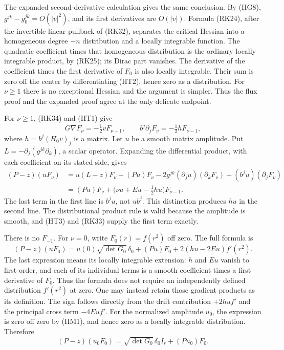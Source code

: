 \documentclass[
  11pt,
]{article}
\begin{document}
The expanded second-derivative calculation gives the same conclusion. By
(HG8), \(g^{jk}-g_0^{jk}=O(|v|^2)\), and its first derivatives are
\(O(|v|)\). Formula (RK24), after the invertible linear pullback of
(RK32), separates the critical Hessian into a homogeneous degree \(-n\)
distribution and a locally integrable function. The quadratic
coefficient times that homogeneous distribution is the ordinary locally
integrable product, by (RK25); its Dirac part vanishes. The derivative
of the coefficient times the first derivative of \(F_0\) is also locally
integrable. Their sum is zero off the center by differentiating (HT2),
hence zero as a distribution. For \(\nu\geq1\) there is no exceptional
Hessian and the argument is simpler. Thus the flux proof and the
expanded proof agree at the only delicate endpoint.

For \(\nu\geq1\), (RK34) and (HT1) give \[
       G\nabla F_\nu=-\tfrac12v F_{\nu-1},\qquad
       b^j\partial_jF_\nu=-\tfrac12 hF_{\nu-1},               \tag{HT4}
\] where \(h=b^j(H_0v)_j\) is a matrix. Let \(u\) be a smooth matrix
amplitude. Put \(L=-\partial_j(g^{jk}\partial_k)\), a scalar operator.
Expanding the differential product, with each coefficient on its stated
side, gives \[
\begin{split}
 (P-z)(uF_\nu)
 &=u(L-z)F_\nu+(Pu)F_\nu
       -2g^{jk}(\partial_ju)(\partial_kF_\nu)
       +(b^ju)(\partial_jF_\nu)\\
 &=(Pu)F_\nu+
       \bigl(\nu u+Eu-\tfrac12hu\bigr)F_{\nu-1}.
\end{split}                                                    \tag{HT5}
\] The last term in the first line is \(b^ju\), not \(ub^j\). This
distinction produces \(hu\) in the second line. The distributional
product rule is valid because the amplitude is smooth, and (HT3) and
(RK33) supply the first term exactly.

There is no \(F_{-1}\). For \(\nu=0\), write \(F_0(r)=f(r^2)\) off zero.
The full formula is \[
 (P-z)(uF_0)
   =u(0)\sqrt{\det G_0}\,\delta_0
         +(Pu)F_0+2(hu-2Eu)f'(r^2).                           \tag{HT6}
\] The last expression means its locally integrable extension: \(h\) and
\(Eu\) vanish to first order, and each of its individual terms is a
smooth coefficient times a first derivative of \(F_0\). Thus the formula
does not require an independently defined distribution \(f'(r^2)\) at
zero. One may instead retain those gradient products as its definition.
The sign follows directly from the drift contribution \(+2hu f'\) and
the principal cross term \(-4Eu f'\). For the normalized amplitude
\(u_0\), the expression is zero off zero by (HM1), and hence zero as a
locally integrable distribution. Therefore \[
          (P-z)(u_0F_0)=\sqrt{\det G_0}\,\delta_0I_r+(Pu_0)F_0.
                                                               \tag{HT7}
\]
\end{document}
